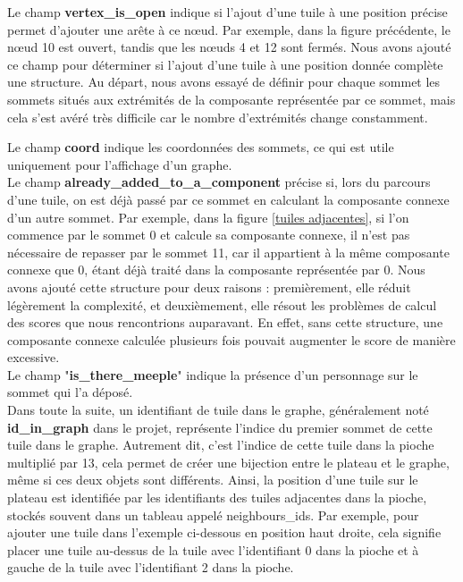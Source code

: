  Le champ \textbf{vertex\_is\_open} indique si l'ajout d'une tuile à une position précise permet d'ajouter une arête à ce nœud. Par exemple, dans la figure précédente, le nœud 10 est ouvert, tandis que les nœuds 4 et 12 sont fermés. Nous avons ajouté ce champ pour déterminer si l'ajout d'une tuile à une position donnée complète une structure. Au départ, nous avons essayé de définir pour chaque sommet les sommets situés aux extrémités de la composante représentée par ce sommet, mais cela s'est avéré très difficile car le nombre d'extrémités change constamment.





 
 
 
 Le champ \textbf{coord} indique les coordonnées des sommets, ce qui est utile uniquement pour l'affichage d'un graphe.\\ 

 
Le champ \textbf{already\_added\_to\_a\_component} précise si, lors du parcours d'une tuile, on est déjà passé par ce sommet en calculant la composante connexe d'un autre sommet. Par exemple, dans la figure \ref{tuiles adjacentes}, si l'on commence par le sommet 0 et calcule sa composante connexe, il n'est pas nécessaire de repasser par le sommet 11, car il appartient à la même composante connexe que 0, étant déjà traité dans la composante représentée par 0. Nous avons ajouté cette structure pour deux raisons : premièrement, elle réduit légèrement la complexité, et deuxièmement, elle résout les problèmes de calcul des scores que nous rencontrions auparavant. En effet, sans cette structure, une composante connexe calculée plusieurs fois pouvait augmenter le score de manière excessive.\\

Le champ "\textbf{is\_there\_meeple}" indique la présence d'un personnage sur le sommet qui l'a déposé.\\



 
 Dans toute la suite, un identifiant de tuile dans le graphe, généralement noté \textbf{id\_in\_graph} dans le projet, représente l'indice du premier sommet de cette tuile dans le graphe. Autrement dit, c'est l'indice de cette tuile dans la pioche multiplié par 13, cela permet de créer une bijection entre le plateau et le graphe, même si ces deux objets sont différents. Ainsi, la position d'une tuile sur le plateau est identifiée par les identifiants des tuiles adjacentes dans la pioche, stockés souvent dans un tableau appelé neighbours\_ids. Par exemple, pour ajouter une tuile dans l'exemple ci-dessous en position haut droite, cela signifie placer une tuile au-dessus de la tuile avec l'identifiant 0 dans la pioche et à gauche de la tuile avec l'identifiant 2 dans la pioche.
 
